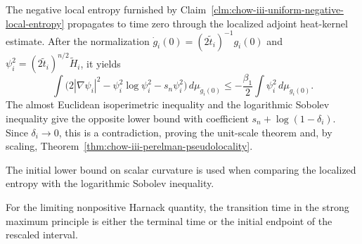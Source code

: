 \begin{theorem}
\label{thm:chow-iii-pseudolocality-log-sobolev-contradiction}


The negative local entropy furnished by Claim~\ref{clm:chow-iii-uniform-negative-local-entropy}
propagates to time zero through the localized adjoint heat-kernel estimate.  After
the normalization \(\dot g_i(0)=(2\widetilde t_i)^{-1}g_i(0)\) and
\(\psi_i^2=(2\widetilde t_i)^{n/2}\widetilde H_i\), it yields
\[
\int\bigl(2|\nabla\psi_i|^2-\psi_i^2\log\psi_i^2-s_n\psi_i^2\bigr)
\,d\mu_{\dot g_i(0)}\le-\frac{\beta_1}{2}\int\psi_i^2\,d\mu_{\dot g_i(0)}.
\]
The almost Euclidean isoperimetric inequality and the logarithmic Sobolev
inequality give the opposite lower bound with coefficient
\(s_n+\log(1-\delta_i)\).  Since \(\delta_i\to0\), this is a contradiction,
proving the unit-scale theorem and, by scaling, Theorem~\ref{thm:chow-iii-perelman-pseudolocality}.
\end{theorem}

\begin{remark}
\label{rem:chow-iii-pseudolocality-scalar-role}

The initial lower bound on scalar curvature is used when comparing the localized
entropy with the logarithmic Sobolev inequality.
\end{remark}

\begin{theorem}
\label{ex:chow-iii-entropy-rigidity-alternatives}
For the limiting nonpositive Harnack quantity, the transition time in the
strong maximum principle is either the terminal time or the initial endpoint
of the rescaled interval.
\end{theorem}
